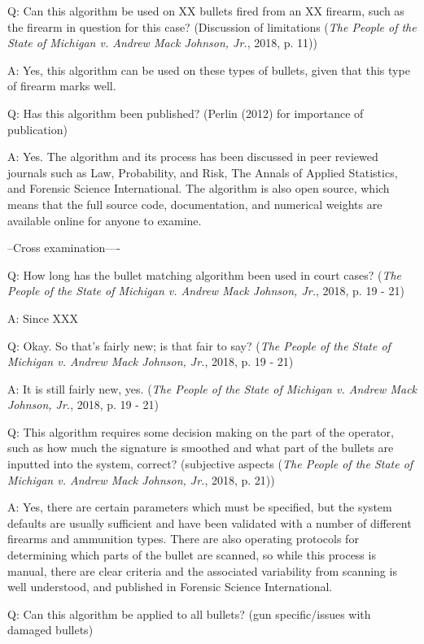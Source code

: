 \documentclass[print]{nuthesis}
\begin{document}
Q: Can this algorithm be used on XX bullets fired from an XX firearm, such as the firearm in question for this case?
(Discussion of limitations (\emph{The {People} of the {State} of {Michigan} v. Andrew {Mack} {Johnson}, {Jr.}}, 2018, p. 11))

A: Yes, this algorithm can be used on these types of bullets, given that this type of firearm marks well.

Q: Has this algorithm been published? (Perlin (2012) for importance of publication)

A: Yes. The algorithm and its process has been discussed in peer reviewed journals such as Law, Probability, and Risk, The Annals of Applied Statistics, and Forensic Science International.
The algorithm is also open source, which means that the full source code, documentation, and numerical weights are available online for anyone to examine.

--Cross examination----

Q: How long has the bullet matching algorithm been used in court cases? (\emph{The {People} of the {State} of {Michigan} v. Andrew {Mack} {Johnson}, {Jr.}}, 2018, p. 19 - 21)

A: Since XXX

Q: Okay. So that's fairly new; is that fair to say? (\emph{The {People} of the {State} of {Michigan} v. Andrew {Mack} {Johnson}, {Jr.}}, 2018, p. 19 - 21)

A: It is still fairly new, yes. (\emph{The {People} of the {State} of {Michigan} v. Andrew {Mack} {Johnson}, {Jr.}}, 2018, p. 19 - 21)

Q: This algorithm requires some decision making on the part of the operator, such as how much the signature is smoothed and what part of the bullets are inputted into the system, correct? (subjective aspects (\emph{The {People} of the {State} of {Michigan} v. Andrew {Mack} {Johnson}, {Jr.}}, 2018, p. 21))

A: Yes, there are certain parameters which must be specified, but the system defaults are usually sufficient and have been validated with a number of different firearms and ammunition types.
There are also operating protocols for determining which parts of the bullet are scanned, so while this process is manual, there are clear criteria and the associated variability from scanning is well understood, and published in Forensic Science International.

Q: Can this algorithm be applied to all bullets? (gun specific/issues with damaged bullets)
\end{document}
